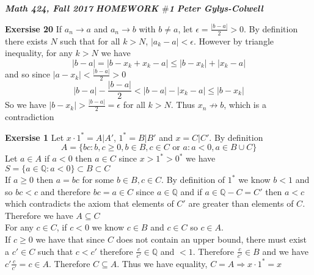 \documentclass[12pt]{article}
\newcounter{ques}[section]
\newenvironment{ques}[1]{\textbf{Exersise #1} \vspace{1mm}}{\medskip}
\theoremstyle{definition}
\begin{document}
\noindent \textit{\textbf{Math 424, Fall 2017}} \hspace{1.3cm}
\textit{\textbf{HOMEWORK $\#$1}} \hspace{1.3cm} \textit{\textbf{Peter
Gylys-Colwell}} 

\vspace{1cm}

\begin{ques}{20}
	If $a_n \to a$ and $a_n \to b$ with $b \neq a$, let $\epsilon = \frac
	{|b - a|} 2 > 0$. By definition there exists $N$ such that for all $k
	> N$, $|a_k - a| < \epsilon$. However by triangle inequality, for any
	$k > N$ we have 
	$$|b - a| = |b - x_k + x_k - a| \leq |b - x_k| + |x_k - a|$$
	and so since $|a - x_k| < \frac{|b-a|}{2} > 0$
	$$|b-a| - \frac {|b-a|}{2} < |b - a| - |x_k - a| \leq |b - x_k|$$
	So we have $|b - x_k| > \frac{|b - a|}{2} = \epsilon$ for all $k > N$.
	Thus $x_n \not \to b$, which is a contradiction
\end{ques}

\begin{ques}{1}
	Let $x \cdot 1^* = A|A'$, $1^* = B|B'$ and $x = C|C'$. By definition 
	$$A = \{bc : b, c \geq 0, b \in B, c \in C \text{ or } a : a < 0, a \in
	B \cup C\}$$
	Let $a \in A$ if $a < 0$ then $a \in C$ since $x > 1^* > 0^*$ we have
	$S = \{a \in \mathbb Q: a < 0\} \subset B \subset C$\\
	If $a \geq 0$ then $a = bc$ for some $b \in B, c \in C$. By definition
	of $1^*$ we know $b < 1$ and so $bc < c$ and therefore $bc = a \in C$
	since $a \in \mathbb Q$ and if $a \in \mathbb Q - C = C'$ then $a < c$
	which contradicts the axiom that elements of $C'$ are greater than
	elements of $C$. Therefore we have $A \subseteq C$\\
	For any $c \in C$, if $c < 0$ we know $c \in B$ and $c \in C$ so $c \in A$.\\
	If $c \geq 0$ we have that since $C$ does not contain an upper bound,
	there must exist a $c' \in C$ such that $c < c'$ therefore $\frac c
	{c'} \in \mathbb Q$ and $ < 1$. Therefore $\frac c {c'} \in B$ and we
	have $c' \frac c {c'} = c \in A$. Therefore $C \subseteq A$. Thus we
	have equality, $C =A \Rightarrow x \cdot 1^* = x$

\end{ques}
\end{document}
